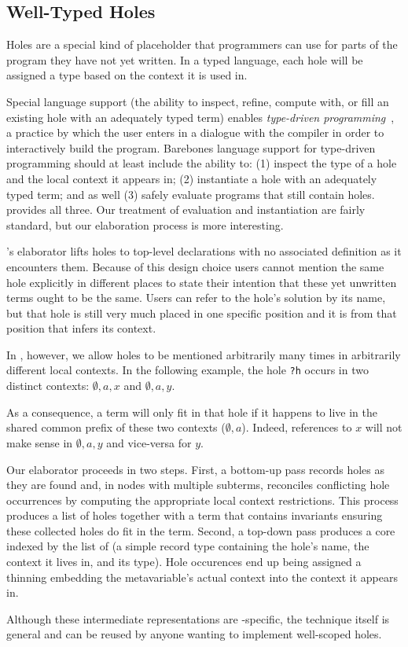 \subsection{Well-Typed Holes}
\label{sec:design:holes}

Holes are a special kind of placeholder that programmers can use for parts of the program they have not yet written.
%
In a typed language, each hole will be assigned a type based on the context it is used in.

Special language support (the ability to inspect, refine, compute with, or fill an existing hole with an adequately typed term) enables \emph{type-driven programming}~\cite{DBLP:journals/pacmpl/OmarVCH19},
a practice by which the user enters in a dialogue with the compiler in order
to interactively build the program.
%
Barebones language support for type-driven programming should at least include the ability to:
%
(1) inspect the type of a hole and the local context it appears in;
%
(2) instantiate a hole with an adequately typed term;
%
and as well
%
(3) safely evaluate programs that still contain holes.
%
\Velo{} provides all three.
%
Our treatment of evaluation and instantiation are fairly standard, but our elaboration process is more interesting.

\Idris{}'s elaborator lifts holes to top-level declarations with no associated definition as it encounters them.
%
Because of this design choice users cannot mention the same hole explicitly in different places to state their intention that these yet unwritten terms ought to be the same.
%
Users can refer to the hole's solution by its name, but that hole is still very much placed in one specific position and it is from that position that \Idris{} infers its context.

In \Velo{}, however, we allow holes to be mentioned arbitrarily many times in
arbitrarily different local contexts.
%
In the following example, the hole \texttt{?h} occurs in two distinct contexts: $\emptyset,a,x$ and $\emptyset,a,y$.

\begin{center}
  \holeexamplegraph{}
\end{center}

As a consequence, a term will only fit in that hole if it happens to live in the shared common prefix of these two contexts ($\emptyset,a$).
%
Indeed, references to $x$ will not make sense in $\emptyset,a,y$ and vice-versa for $y$.


Our elaborator proceeds in two steps.
%
First, a bottom-up pass records holes as they are found and, in nodes with multiple subterms, reconciles conflicting hole occurrences by computing the appropriate local context restrictions.
%
This process produces a list of holes together with a  term that contains invariants ensuring these collected holes do fit in the term.
%
Second, a top-down pass produces a core  indexed by the list of  (a simple record type containing the hole's name, the context it lives in, and its type).
%
Hole occurences end up being assigned a thinning embedding the metavariable's actual context into the context it appears in.

Although these intermediate representations are \Velo{}-specific, the technique
itself is general and can be reused by anyone wanting to implement well-scoped holes.

